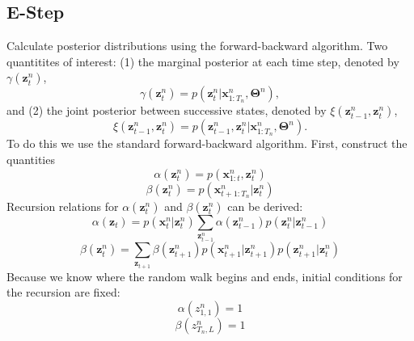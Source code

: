 \documentclass[reqno]{amsart}
\numberwithin{equation}{section}
\begin{document}
\subsection{E-Step}
Calculate posterior distributions using the forward-backward algorithm. Two quantitites of interest: (1) the marginal posterior at each time step, denoted by $\gamma(\mathbf{z}_t^n)$,
\begin{equation}
\gamma(\mathbf{z}_t^n) = p(\mathbf{z}_t^n|\mathbf{x}_{1:T_n}^n,\mathbf{\Theta}^n),
\end{equation}
and (2) the joint posterior between successive states, denoted by $\xi(\mathbf{z}_{t-1}^n,\mathbf{z}_{t}^n)$,
\begin{equation}
\xi(\mathbf{z}_{t-1}^n,\mathbf{z}_t^n) = p(\mathbf{z}_{t-1}^n,\mathbf{z}_t^n|\mathbf{x}_{1:T_n}^n,\mathbf{\Theta}^n).
\end{equation}
To do this we use the standard forward-backward algorithm. First, construct the quantities
\begin{equation}
\alpha(\mathbf{z}_t^n)=p(\mathbf{x}_{1:t}^n,\mathbf{z}_t^n)
\end{equation}
\begin{equation}
\beta(\mathbf{z}_t^n)=p(\mathbf{x}_{t+1:T_n}^n|\mathbf{z}_t^n)
\end{equation}
Recursion relations for $\alpha(\mathbf{z}_t^n)$ and $\beta(\mathbf{z}_t^n)$ can be derived:
\begin{equation}
\alpha(\mathbf{z}_t) = p(\mathbf{x}_t^n|\mathbf{z}_t^n)\displaystyle\sum_{\mathbf{z}_{t-1}^n}\alpha(\mathbf{z}_{t-1}^n)p(\mathbf{z}_t^n|\mathbf{z}_{t-1}^n)
\end{equation}
\begin{equation}
\beta(\mathbf{z}_t^n) = \displaystyle\sum_{\mathbf{z}_{t+1}}\beta(\mathbf{z}_{t+1}^n)p(\mathbf{x}_{t+1}^n|\mathbf{z}_{t+1}^n)p(\mathbf{z}_{t+1}^n|\mathbf{z}_t^n)
\end{equation}
Because we know where the random walk begins and ends, initial conditions for the recursion are fixed:
\begin{equation}
\alpha(z_{1,1}^n) = 1
\end{equation}
\begin{equation}
\beta(z_{T_n,L}^n) = 1 
\end{equation}
\end{document}
